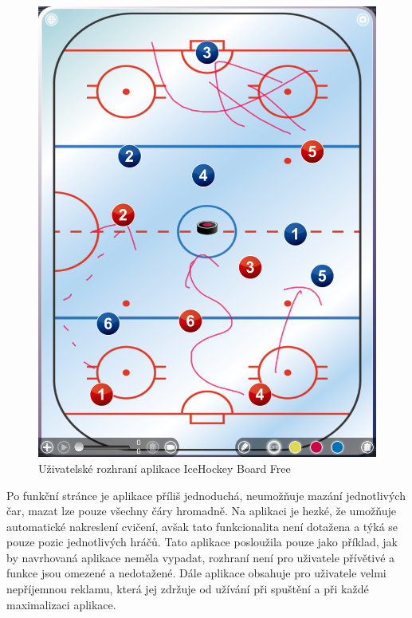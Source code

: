 \documentclass[thesis=B,czech]{FITthesis}[2012/06/26]
\begin{document}
	\begin{figure}[p]
		\centering
		\includegraphics[width=\textwidth]{img/competition/icehockey_board_free/IMG_0018}
		\caption{Uživatelské rozhraní aplikace IceHockey Board Free}
		\label{pic:icehockey_board_free}
	\end{figure}

	Po funkční stránce je aplikace příliš jednoduchá, neumožňuje mazání jednotlivých čar, mazat lze pouze všechny čáry hromadně. Na aplikaci je hezké, že umožňuje automatické nakreslení cvičení, avšak tato funkcionalita není dotažena a týká se pouze pozic jednotlivých hráčů. Tato aplikace posloužila pouze jako příklad, jak by navrhovaná aplikace neměla vypadat, rozhraní není pro uživatele přívětivé a funkce jsou omezené a nedotažené. Dále aplikace obsahuje pro uživatele velmi nepříjemnou reklamu, která jej zdržuje od užívání při spuštění a při každé maximalizaci aplikace.

	\newpage
\end{document}
